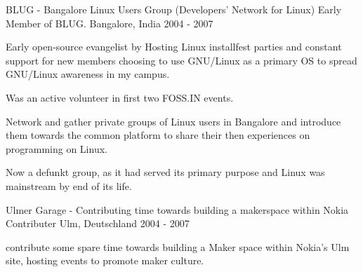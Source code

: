 

\begin{cventries}

  \cventry
    {BLUG - Bangalore Linux Users Group (Developers’ Network for Linux)} %
    {Early Member of BLUG.} %
    {Bangalore, India} %
    {2004 - 2007} %
    {
      \begin{cvitems} %
        \item {Early open-source evangelist by Hosting Linux installfest parties and constant support for new members choosing to use GNU/Linux as a primary OS to spread GNU/Linux awareness in my campus.}
        \item {Was an active volunteer in first two FOSS.IN events.}
        \item {Network and gather private groups of Linux users in Bangalore and introduce them towards the common platform to share their then experiences on programming on Linux.}
        \item {Now a defunkt group, as it had served its primary purpose and Linux was mainstream by end of its life.}
      \end{cvitems}
    }

	\cventry
	{Ulmer Garage - Contributing time towards building a makerspace within Nokia} %
    {Contributer} %
    {Ulm, Deutschland} %
    {2004 - 2007} %
    {
    	  \begin{cvitems}
    	    \item {contribute some spare time towards building a Maker space within Nokia's Ulm site, hosting events to promote maker culture.}
    	  \end{cvitems}
    }
\end{cventries}
